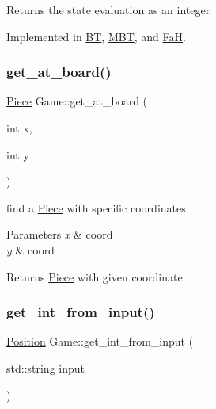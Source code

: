 \begin{DoxyReturn}{Returns}
the state evaluation as an integer 
\end{DoxyReturn}


Implemented in \hyperlink{class_b_t_a330840afc9271716265fb65eb037d351}{BT}, \hyperlink{class_m_b_t_a62bfe73fc6dd6da20650f27024dd0115}{M\+BT}, and \hyperlink{class_fa_h_a79788a0309788fed655c77bea2167110}{FaH}.

\mbox{\label{class_game_a255e5bb1512854fd8df8cef51fab49d8}} 
\subsubsection{\texorpdfstring{get\+\_\+at\+\_\+board()}{get\_at\_board()}}
{\footnotesize\ttfamily \hyperlink{class_piece}{Piece} Game\+::get\+\_\+at\+\_\+board (\begin{DoxyParamCaption}\item[{int}]{x,  }\item[{int}]{y }\end{DoxyParamCaption})}



find a \hyperlink{class_piece}{Piece} with specific coordinates 


\begin{DoxyParams}{Parameters}
{\em x} & coord \\
\hline
{\em y} & coord \\
\hline
\end{DoxyParams}
\begin{DoxyReturn}{Returns}
\hyperlink{class_piece}{Piece} with given coordinate 
\end{DoxyReturn}
\mbox{\label{class_game_a2a71f9781d47c4b7c62005bb14f6bfa3}} 
\subsubsection{\texorpdfstring{get\+\_\+int\+\_\+from\+\_\+input()}{get\_int\_from\_input()}}
{\footnotesize\ttfamily \hyperlink{struct_position}{Position} Game\+::get\+\_\+int\+\_\+from\+\_\+input (\begin{DoxyParamCaption}\item[{std\+::string}]{input }\end{DoxyParamCaption})}



